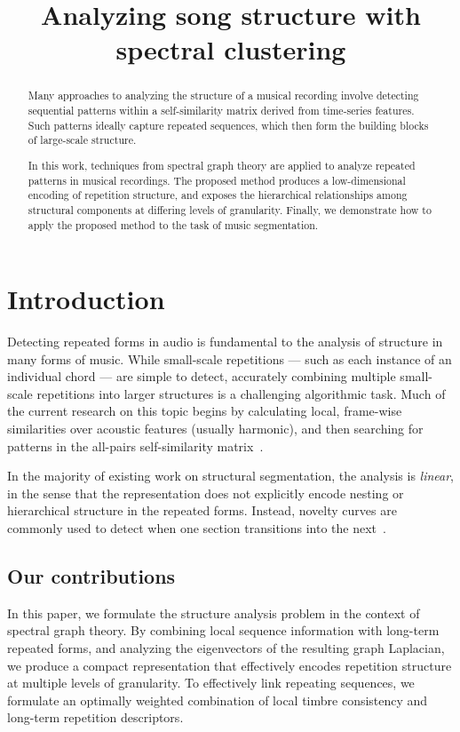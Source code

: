 \documentclass{article}
\title{Analyzing song structure with spectral clustering}
\begin{document}
%
\maketitle
%
\begin{abstract}
Many approaches to analyzing the structure of a musical recording involve detecting
sequential patterns within a self-similarity matrix derived from time-series features.
Such patterns ideally capture repeated sequences, which then form the building blocks
of large-scale structure.

In this work, techniques from spectral graph theory are applied to analyze repeated
patterns in musical recordings.  The proposed method produces a low-dimensional
encoding of repetition structure, and exposes the hierarchical relationships among
structural components at differing levels of granularity.  Finally, we demonstrate how
to apply the proposed method to the task of music segmentation.
\end{abstract}
%
\section{Introduction}\label{sec:introduction}
Detecting repeated forms in audio is fundamental to the analysis of structure in many 
forms of music.  While small-scale repetitions --- such as each instance of an
individual chord --- are simple to detect, accurately combining multiple 
small-scale repetitions into larger structures is a challenging algorithmic task.
Much of the current research on this topic begins by calculating local, frame-wise
similarities over acoustic features (usually harmonic), and then searching for
patterns in the all-pairs self-similarity matrix~\cite{foote2000automatic}.

In the majority of existing work on structural segmentation, the analysis is
\emph{linear}, in the sense that the representation does not explicitly encode nesting
or hierarchical structure in the repeated forms.  Instead, novelty curves are commonly
used to detect when one section transitions into the
next~\cite{serra2012unsupervised}. 



\subsection{Our contributions}
In this paper, we formulate the structure analysis problem in the context of spectral
graph theory.  By combining local sequence information with long-term repeated forms,
and analyzing the eigenvectors of the resulting graph Laplacian, we produce a compact
representation that effectively encodes repetition structure at multiple levels of
granularity.  To effectively link repeating sequences, we formulate an optimally
weighted combination of local timbre consistency and long-term repetition descriptors.
\end{document}
